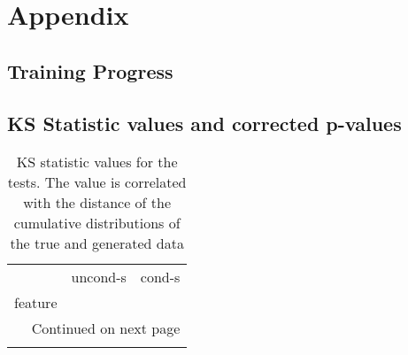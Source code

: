 \chapter{Appendix}
\section{Training Progress}

\section{KS Statistic values and corrected p-values}

\begin{longtable}{lrr}
	\caption[KS statistic values]{ \small KS statistic values for the tests. The value is correlated with the distance of the cumulative distributions of the true and generated data}\\
	\toprule
	{} &  uncond-s &    cond-s \\
	feature                       &           &           \\
	\midrule
	\endhead
	\midrule
	\multicolumn{3}{r}{{Continued on next page}} \\
	\midrule
	\endfoot
	

\end{longtable}
